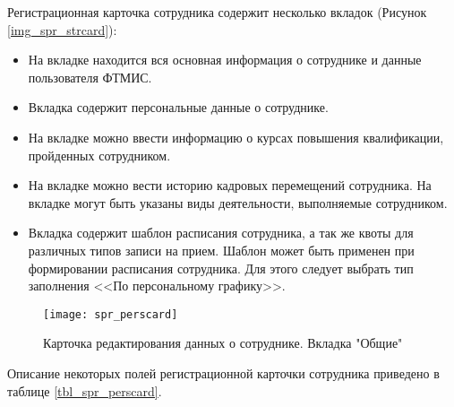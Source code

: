 Регистрационная карточка сотрудника содержит несколько вкладок (Рисунок \ref{img_spr_strcard}):
\begin{itemize}
 \item На вкладке  находится вся основная информация о сотруднике и данные пользователя ФТМИС.
 \item Вкладка  содержит персональные данные о сотруднике.
 \item На вкладке  можно ввести информацию о курсах повышения квалификации, пройденных сотрудником.
 \item На вкладке  можно вести историю кадровых перемещений сотрудника.
 На вкладке  могут быть указаны виды деятельности, выполняемые сотрудником.
 \item Вкладка  содержит шаблон расписания сотрудника, а так же квоты для различных типов записи на прием. Шаблон может быть применен при формировании расписания сотрудника. Для этого следует выбрать тип заполнения <<По персональному графику>>.
\end{itemize}
 
\begin{figure}[ht!]\centering
 \texttt{[image: spr\_perscard]}
 \caption{Карточка редактирования данных о сотруднике. Вкладка "Общие"}
 \label{img_spr_perscard}
\end{figure}

Описание некоторых полей регистрационной карточки сотрудника приведено в таблице \ref{tbl_spr_perscard}.

